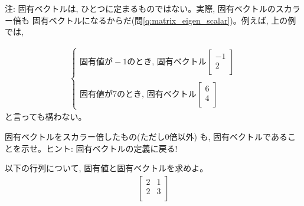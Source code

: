 注: 固有ベクトルは, ひとつに定まるものではない。実際, 固有ベクトルのスカラー倍も
固有ベクトルになるからだ(問\ref{q:matrix_eigen_scalar})。例えば, 上の例では, 

\begin{eqnarray*}\begin{cases}
\text{固有値が}-1\text{のとき, 固有ベクトル}
\begin{bmatrix}
-1 \\
2 \\
\end{bmatrix}\\
\\
\text{固有値が}7\text{のとき, 固有ベクトル}
\begin{bmatrix}
6 \\
4 \\
\end{bmatrix}
\end{cases}\end{eqnarray*}
と言っても構わない。

\begin{q}\label{q:matrix_eigen_scalar} 固有ベクトルをスカラー倍したもの(ただし0倍以外)
も, 固有ベクトルであることを示せ。ヒント: 固有ベクトルの定義に戻る!\end{q}

\begin{q}\label{q:matrix_eigen2D0} 以下の行列について, 固有値と固有ベクトルを求めよ。
\begin{eqnarray} \begin{bmatrix}
2 & 1\\
2 & 3\\
\end{bmatrix}\label{eq:matrix_lintrans_mondai}\end{eqnarray}
\end{q}

